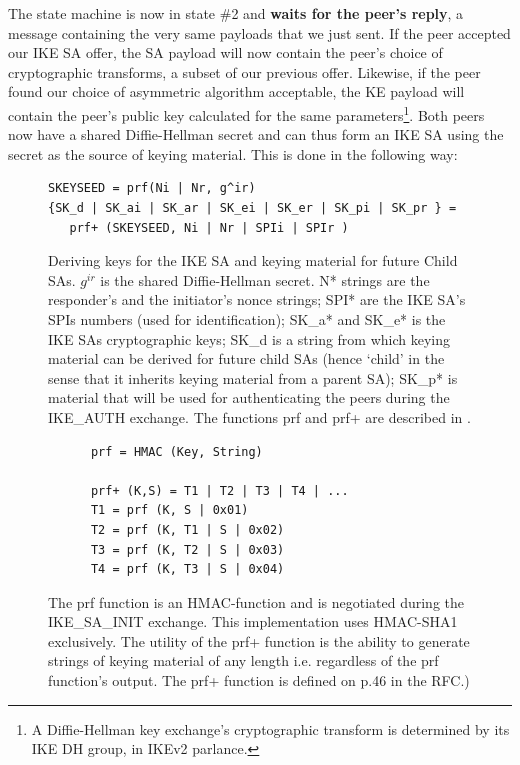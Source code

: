 \documentclass[final,a4paper,twoside,11pt,onecolumn]{report}
\begin{document}
The state machine is now in state \#2 and \textbf{waits for the peer's reply}, a message containing the very same payloads that we just sent. If the peer accepted our IKE SA offer, the SA payload will now contain the peer's choice of cryptographic transforms, a subset of our previous offer. Likewise, if the peer found our choice of asymmetric algorithm acceptable, the KE payload will contain the peer's public key calculated for the same parameters\footnote{A Diffie-Hellman key exchange's cryptographic transform is determined by its IKE DH group, in IKEv2 parlance.}. Both peers now have a shared Diffie-Hellman secret and can thus form an IKE SA using the secret as the source of keying material. This is done in the following way:

\begin{figure}[h]
   \begin{verbatim}
SKEYSEED = prf(Ni | Nr, g^ir) 
{SK_d | SK_ai | SK_ar | SK_ei | SK_er | SK_pi | SK_pr } =
   prf+ (SKEYSEED, Ni | Nr | SPIi | SPIr )
   \end{verbatim}
   \caption{Deriving keys for the IKE SA and keying material for future Child SAs. $g^{ir}$ is the shared Diffie-Hellman secret. N* strings are the responder's and the initiator's nonce strings; SPI* are the IKE SA's SPIs numbers (used for identification); SK\_a* and SK\_e* is the IKE SAs cryptographic keys; SK\_d is a string from which keying material can be derived for future child SAs (hence `child' in the sense that it inherits keying material from a parent SA); SK\_p* is material that will be used for authenticating the peers during the IKE\_AUTH exchange. The functions prf and prf+ are described in .}
\end{figure}


\begin{figure}[h]
   \begin{verbatim}
      prf = HMAC (Key, String) 
      
      prf+ (K,S) = T1 | T2 | T3 | T4 | ...
      T1 = prf (K, S | 0x01)
      T2 = prf (K, T1 | S | 0x02)
      T3 = prf (K, T2 | S | 0x03)
      T4 = prf (K, T3 | S | 0x04)
   \end{verbatim}
   \caption[The functions prf and prf+]{The prf function is an HMAC-function and is negotiated during the IKE\_SA\_INIT exchange. This implementation uses HMAC-SHA1 exclusively. The utility of the prf+ function is the ability to generate strings of keying material of any length i.e. regardless of the prf function's output. The prf+ function is defined on p.46 in the RFC.) }
   \label{fig:prf}
\end{figure}
\end{document}
